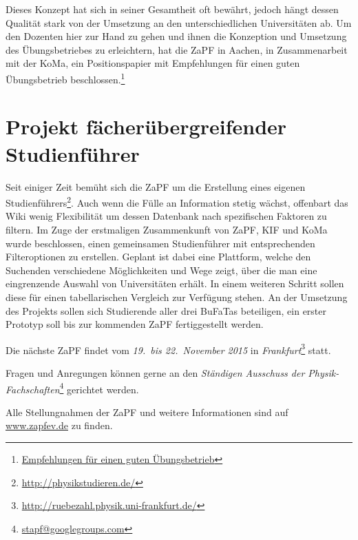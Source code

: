 \documentclass{scrartcl}
\begin{document}
Dieses Konzept hat sich in seiner Gesamtheit oft bewährt, jedoch hängt dessen Qualität stark von der Umsetzung an den unterschiedlichen Universitäten ab. Um den Dozenten hier zur Hand zu gehen und ihnen die Konzeption und
Umsetzung des Übungsbetriebes zu erleichtern, hat die ZaPF in Aachen, in
Zusammenarbeit mit der KoMa, ein Positionspapier mit Empfehlungen
für einen guten Übungsbetrieb beschlossen.\footnote{\href{http://www.zapfev.de/resolutionen/sose15/Positionspapier\_Uebungskonzepte/Positionspapier\_SoSe15\_Uebungskonzepte.pdf}{Empfehlungen für einen guten Übungsbetrieb}}

\section*{Projekt fächerübergreifender Studienführer }

Seit einiger Zeit bemüht sich die ZaPF um die Erstellung eines eigenen
Studienführers\footnote{\href{http://physikstudieren.de/}{\url{http://physikstudieren.de/}}}.
Auch wenn die Fülle an Information stetig wächst, offenbart das Wiki wenig
Flexibilität um dessen Datenbank nach spezifischen Faktoren zu filtern. Im
Zuge der erstmaligen Zusammenkunft von ZaPF, KIF und KoMa wurde beschlossen, einen gemeinsamen Studienführer mit entsprechenden
Filteroptionen zu erstellen. Geplant ist dabei eine Plattform, welche den
Suchenden verschiedene Möglichkeiten und Wege zeigt, über die man eine
eingrenzende Auswahl von Universitäten erhält. In einem weiteren Schritt sollen
diese für einen tabellarischen Vergleich zur Verfügung stehen.  An der
Umsetzung des Projekts sollen sich Studierende aller drei BuFaTas beteiligen, ein
erster Prototyp soll bis zur kommenden ZaPF fertiggestellt werden.


\vspace{0.5cm}
Die nächste ZaPF findet vom \emph{19.\ bis 22.\ November 2015} in \emph{Frankfurt}\footnote{\href{http://ruebezahl.physik.uni-frankfurt.de/}{\url{http://ruebezahl.physik.uni-frankfurt.de/}}} statt.

Fragen und Anregungen können gerne an den \emph{Ständigen Ausschuss der Physik-Fachschaften}\footnote{\href{mailto:stapf@googlegroups.com}{\url{stapf@googlegroups.com}}} gerichtet werden.

Alle Stellungnahmen der ZaPF und weitere Informationen sind auf \href{http://www.zapfev.de}{\url{www.zapfev.de}} zu finden.
\end{document}
